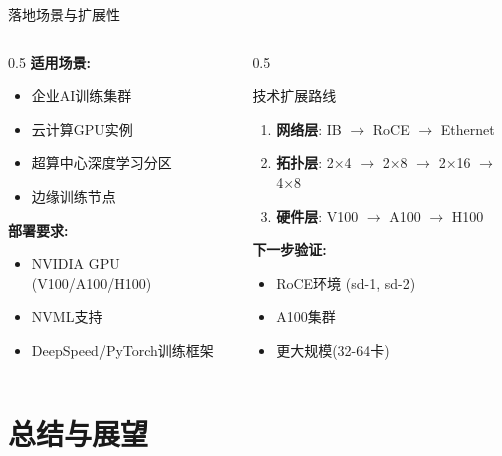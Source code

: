 \documentclass[aspectratio=169,10pt]{beamer}
\begin{document}
\begin{frame}{落地场景与扩展性}
\begin{columns}
\begin{column}{0.5\textwidth}
\textbf{适用场景:}
\begin{itemize}
    \item 企业AI训练集群
    \item 云计算GPU实例
    \item 超算中心深度学习分区
    \item 边缘训练节点
\end{itemize}
\vspace{0.3cm}
\textbf{部署要求:}
\begin{itemize}
    \item NVIDIA GPU (V100/A100/H100)
    \item NVML支持
    \item DeepSpeed/PyTorch训练框架
\end{itemize}
\end{column}
\begin{column}{0.5\textwidth}
\begin{block}{技术扩展路线}
\begin{enumerate}
    \item \textbf{网络层}: IB $\rightarrow$ RoCE $\rightarrow$ Ethernet
    \item \textbf{拓扑层}: 2×4 $\rightarrow$ 2×8 $\rightarrow$ 2×16 $\rightarrow$ 4×8
    \item \textbf{硬件层}: V100 $\rightarrow$ A100 $\rightarrow$ H100
\end{enumerate}
\end{block}
\vspace{0.3cm}
\textbf{下一步验证:}
\begin{itemize}
    \item RoCE环境 (sd-1, sd-2)
    \item A100集群
    \item 更大规模(32-64卡)
\end{itemize}
\end{column}
\end{columns}
\end{frame}

\section{总结与展望}
\end{document}
